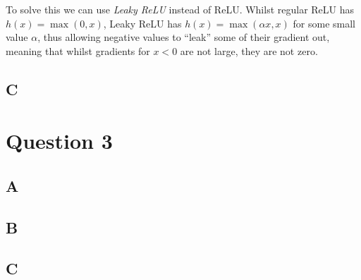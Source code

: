 \documentclass{article}
\begin{document}
To solve this we can use \textit{Leaky ReLU} instead of ReLU. Whilst regular ReLU has $h(x) = \max(0, x)$, Leaky ReLU has $h(x) = \max(\alpha x, x)$ for some small value $\alpha$, thus allowing negative values to ``leak'' some of their gradient out, meaning that whilst gradients for $x < 0$ are not large, they are not zero.

\subsection*{C}

\section*{Question 3}

\subsection*{A}

\subsection*{B}

\subsection*{C}
\end{document}
